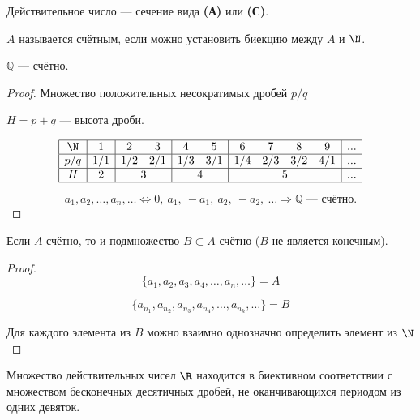 \begin{definition}
Действительное число --- сечение вида \textbf{(А)} или \textbf{(С)}.
\end{definition}

\begin{definition}
\(A\) называется счётным, если можно установить биекцию между \(A\) и \(\N\).
\end{definition}

\begin{theorem}
\(\mathbb{Q}\) --- счётно.
\end{theorem}

\begin{proof}
Множество положительных несократимых дробей \(p/q\)

\(H = p + q\) --- высота дроби.

\[
\begin{array}{|c|c|cc|cc|cccc|c}
\hline
\text{\(\N\)}  & 1   & 2   & 3   & 4   & 5   & 6   & 7   & 8   & 9   & ... \\
\hline
\text{\(p/q\)} & 1/1 & 1/2 & 2/1 & 1/3 & 3/1 & 1/4 & 2/3 & 3/2 & 4/1 & ... \\
\hline
\text{\(H\)}   & 2 & \multicolumn{2}{c|}{3} & \multicolumn{2}{c|}{4} &
    \multicolumn{4}{c|}{5} & ... \\
\hline
\end{array}
\]

\[
a_1, a_2, \ldots, a_n, \ldots \Leftrightarrow  0,\ a_1,\ -a_1,\ a_2,\ -a_2,\
\ldots
\Rightarrow \mathbb{Q}\text{~--- счётно.}
\]
\end{proof}

\begin{theorem}
Если \(A\) счётно, то и подмножество \(B \subset A\) счётно
(\(B\) не является конечным).
\end{theorem}

\begin{proof}
\[
\{a_1, a_2, a_3, a_4, \ldots, a_n, \ldots\} = A
\]

\[
\{a_{n_1}, a_{n_2}, a_{n_3}, a_{n_4}, \ldots, a_{n_k}, \ldots\} = B
\]

Для каждого элемента из \(B\) можно взаимно однозначно определить элемент из
\(\N\)
\end{proof}

\begin{statement}
Множество действительных чисел \(\R\) находится в биективном соответствии с
множеством бесконечных десятичных дробей, не оканчивающихся периодом из одних
девяток.
\end{statement}

